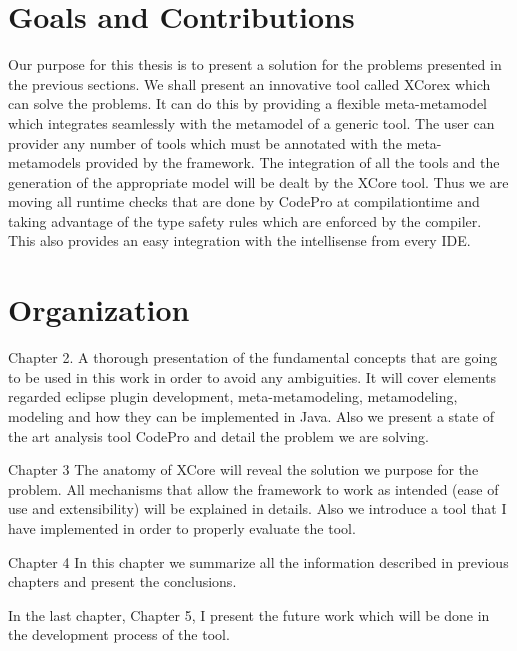 \section{Goals and Contributions}
	
	Our purpose for this thesis is to present a solution for the problems presented
in the previous sections.  We shall present an innovative tool called XCorex
which can solve the problems. It can do this by providing a flexible meta-metamodel 
which integrates seamlessly with the metamodel of a generic tool. The user can
provider any number of tools which must be annotated with the meta-metamodels 
provided by the framework. The integration of all the tools and
the generation of the appropriate model will be dealt by the XCore tool. Thus we
are moving all runtime checks that are done by CodePro at compilationtime and
taking advantage of the type safety rules which are enforced by the compiler. 
This also provides an easy integration with the intellisense from every IDE.

	
	
\section {Organization}
		Chapter 2.  A thorough presentation of the fundamental concepts that are going
to be used in this work in order to avoid any ambiguities.	It will cover
elements regarded eclipse plugin development, meta-metamodeling, metamodeling,
modeling and how they can be implemented in Java. Also we present a state of the
art analysis tool CodePro and detail the problem we are solving.

	Chapter 3  The anatomy of XCore will reveal the solution we purpose for the 
problem. All mechanisms that allow the framework to work as intended (ease of
use and extensibility) will be explained in details.  Also we introduce a tool
that I have implemented in order to properly evaluate the tool.
	
	Chapter 4  In this chapter we summarize all the information described in
previous chapters and present the conclusions.
	
	In the last chapter, Chapter 5, I present the future work which will be done
in the development process of the tool.	
	